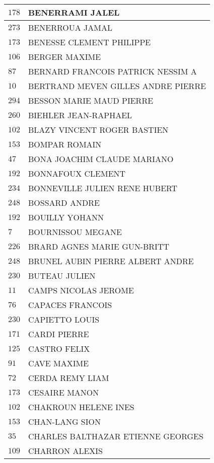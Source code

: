 \begin{xltabular}{\linewidth}{|l|X|}
    $178$ & BENERRAMI JALEL \\
    \hline
    $273$ & BENERROUA JAMAL \\
    \hline
    $173$ & BENESSE CLEMENT PHILIPPE \\
    \hline
    $106$ & BERGER MAXIME \\
    \hline
    $87$ & BERNARD FRANCOIS PATRICK NESSIM A \\
    \hline
    $10$ & BERTRAND MEVEN GILLES ANDRE PIERRE \\
    \hline
    $294$ & BESSON MARIE MAUD PIERRE \\
    \hline
    $260$ & BIEHLER JEAN-RAPHAEL \\
    \hline
    $102$ & BLAZY VINCENT ROGER BASTIEN \\
    \hline
    $153$ & BOMPAR ROMAIN \\
    \hline
    $47$ & BONA JOACHIM CLAUDE MARIANO \\
    \hline
    $192$ & BONNAFOUX CLEMENT \\
    \hline
    $234$ & BONNEVILLE JULIEN RENE HUBERT \\
    \hline
    $248$ & BOSSARD ANDRE \\
    \hline
    $192$ & BOUILLY YOHANN \\
    \hline
    $7$ & BOURNISSOU MEGANE \\
    \hline
    $226$ & BRARD AGNES MARIE GUN-BRITT \\
    \hline
    $248$ & BRUNEL AUBIN PIERRE ALBERT ANDRE \\
    \hline
    $230$ & BUTEAU JULIEN \\
    \hline
    $11$ & CAMPS NICOLAS JEROME \\
    \hline
    $76$ & CAPACES FRANCOIS \\
    \hline
    $230$ & CAPIETTO LOUIS \\
    \hline
    $171$ & CARDI PIERRE \\
    \hline
    $125$ & CASTRO FELIX \\
    \hline
    $91$ & CAVE MAXIME \\
    \hline
    $72$ & CERDA REMY LIAM \\
    \hline
    $173$ & CESAIRE MANON \\
    \hline
    $102$ & CHAKROUN HELENE INES \\
    \hline
    $153$ & CHAN-LANG SION \\
    \hline
    $35$ & CHARLES BALTHAZAR ETIENNE GEORGES \\
    \hline
    $109$ & CHARRON ALEXIS \\

\end{xltabular}
